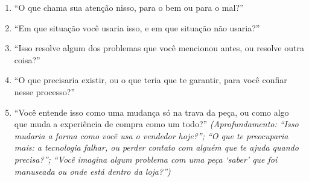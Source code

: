 \begin{enumerate}
    \item ``O que chama sua atenção nisso, para o bem ou para o mal?''
    \item ``Em que situação você usaria isso, e em que situação não usaria?''
    \item ``Isso resolve algum dos problemas que você mencionou antes, ou resolve outra coisa?''
    \item ``O que precisaria existir, ou o que teria que te garantir, para você confiar nesse processo?''
    \item ``Você entende isso como uma mudança só na trava da peça, ou como algo que muda a experiência de compra como um todo?'' \textit{(Aprofundamento: ``Isso mudaria a forma como você usa o vendedor hoje?''; ``O que te preocuparia mais: a tecnologia falhar, ou perder contato com alguém que te ajuda quando precisa?''; ``Você imagina algum problema com uma peça `saber' que foi manuseada ou onde está dentro da loja?'')}
\end{enumerate}
